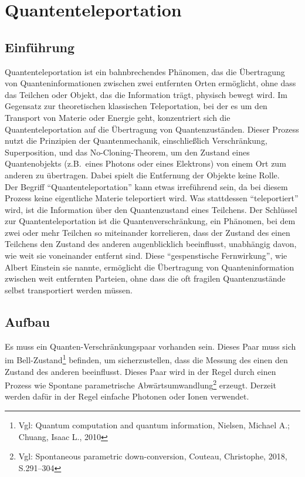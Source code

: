 \section{Quantenteleportation}\label{sec:quantum-teleportation}

\subsection{Einführung}\label{subsec:introduction}
Quantenteleportation ist ein bahnbrechendes Phänomen, das die Übertragung von Quanteninformationen
zwischen zwei entfernten Orten ermöglicht, ohne dass das Teilchen oder Objekt, das die Information trägt, physisch bewegt wird.
Im Gegensatz zur theoretischen klassischen Teleportation, bei der es um den Transport von Materie oder Energie geht,
konzentriert sich die Quantenteleportation auf die Übertragung von Quantenzuständen.
Dieser Prozess nutzt die Prinzipien der Quantenmechanik, einschließlich Verschränkung, Superposition,
und das No-Cloning-Theorem,
um den Zustand eines Quantenobjekts (z.B.\ eines Photons oder eines Elektrons) von einem Ort zum anderen zu übertragen.
Dabei spielt die Entfernung der Objekte keine Rolle.\\

Der Begriff ``Quantenteleportation'' kann etwas irreführend sein, da bei diesem Prozess keine eigentliche Materie teleportiert wird.
Was stattdessen ``teleportiert'' wird, ist die Information über den Quantenzustand eines Teilchens.
Der Schlüssel zur Quantenteleportation ist die Quantenverschränkung,
ein Phänomen, bei dem zwei oder mehr Teilchen so miteinander korrelieren, dass der Zustand des einen Teilchens den Zustand des anderen augenblicklich
 beeinflusst, unabhängig davon, wie weit sie voneinander entfernt sind.
Diese ``gespenstische Fernwirkung'', wie Albert Einstein sie nannte,
ermöglicht die Übertragung von Quanteninformation zwischen weit entfernten Parteien, ohne dass die oft fragilen Quantenzustände selbst transportiert werden müssen.

\subsection{Aufbau}\label{subsec:setup}

Es muss ein Quanten-Verschränkungspaar vorhanden sein.
Dieses Paar muss sich im Bell-Zustand\footnote{Vgl: Quantum computation and quantum information, Nielsen, Michael A.; Chuang, Isaac L., 2010} befinden, um sicherzustellen, dass die Messung des einen den Zustand des anderen beeinflusst.
Dieses Paar wird in der Regel durch einen Prozess wie
Spontane parametrische Abwärtsumwandlung\footnote{Vgl: Spontaneous parametric down-conversion, Couteau, Christophe, 2018, S.291--304} erzeugt.
Derzeit werden dafür in der Regel einfache Photonen oder Ionen verwendet.\\



